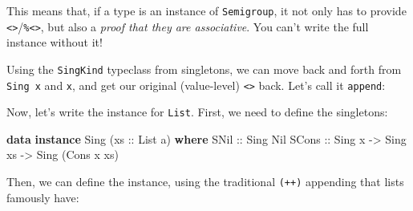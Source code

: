 \documentclass[]{article}
\newenvironment{Shaded}{}{}
\newcommand{\KeywordTok}[1]{\textcolor[rgb]{0.00,0.44,0.13}{\textbf{{#1}}}}
\newcommand{\DataTypeTok}[1]{\textcolor[rgb]{0.56,0.13,0.00}{{#1}}}
\newcommand{\OtherTok}[1]{\textcolor[rgb]{0.00,0.44,0.13}{{#1}}}
\newcommand{\FunctionTok}[1]{\textcolor[rgb]{0.02,0.16,0.49}{{#1}}}
\newcommand{\NormalTok}[1]{{#1}}
\begin{document}
This means that, if a type is an instance of \texttt{Semigroup}, it not only has
to provide
\texttt{\textless{}\textgreater{}}/\texttt{\%\textless{}\textgreater{}}, but
also a \emph{proof that they are associative}. You can't write the full instance
without it!

Using the \texttt{SingKind} typeclass from singletons, we can move back and
forth from \texttt{Sing\ x} and \texttt{x}, and get our original (value-level)
\texttt{\textless{}\textgreater{}} back. Let's call it \texttt{append}:

\begin{Shaded}
\end{Shaded}

Now, let's write the instance for \texttt{List}. First, we need to define the
singletons:

\begin{Shaded}
\begin{Highlighting}[]
\KeywordTok{data} \KeywordTok{instance} \DataTypeTok{Sing} \NormalTok{(}\OtherTok{xs ::} \DataTypeTok{List} \NormalTok{a) }\KeywordTok{where}
    \DataTypeTok{SNil}\OtherTok{  ::} \DataTypeTok{Sing} \DataTypeTok{Nil}
    \DataTypeTok{SCons}\OtherTok{ ::} \DataTypeTok{Sing} \NormalTok{x }\OtherTok{->} \DataTypeTok{Sing} \NormalTok{xs }\OtherTok{->} \DataTypeTok{Sing} \NormalTok{(}\DataTypeTok{Cons} \NormalTok{x xs)}
\end{Highlighting}
\end{Shaded}

Then, we can define the instance, using the traditional \texttt{(++)} appending
that lists famously have:
\end{document}
